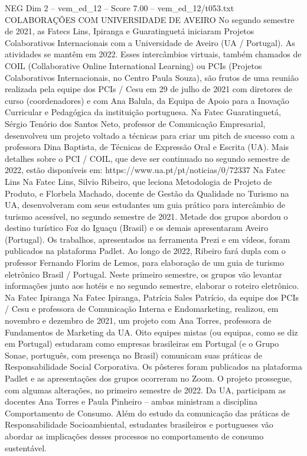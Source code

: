 \begin{textsample}{NEG Dim 2 – vem\_ed\_12 – Score 7.00 – vem\_ed\_12/t053.txt}  \label{ex:f2_neg_077}
COLABORAÇÕES COM UNIVERSIDADE DE AVEIRO No segundo semestre de 2021, as Fatecs Lins, Ipiranga e Guaratinguetá iniciaram Projetos Colaborativos Internacionais com a Universidade de Aveiro (UA / Portugal).
As atividades se mantêm em 2022.
Esses intercâmbios virtuais, também chamados de COIL (Collaborative Online International Learning) ou PCIs (Projetos Colaborativos Internacionais, no Centro Paula Souza), são frutos de uma reunião realizada pela equipe dos PCIs / Cesu em 29 de julho de 2021 com diretores de curso (coordenadores) e com Ana Balula, da Equipa de Apoio para a Inovação Curricular e Pedagógica da instituição portuguesa.
Na Fatec Guaratinguetá, Sérgio Tenório dos Santos Neto, professor de Comunicação Empresarial, desenvolveu um projeto voltado a técnicas para criar um pitch de sucesso com a professora Dina Baptista, de Técnicas de Expressão Oral e Escrita (UA).
Mais detalhes sobre o PCI / COIL, que deve ser continuado no segundo semestre de 2022, estão disponíveis em: https://www.ua.pt/pt/noticias/0/72337 Na Fatec Lins Na Fatec Lins, Silvio Ribeiro, que leciona Metodologia de Projeto de Produto, e Florbela Machado, docente de Gestão da Qualidade no Turismo na UA, desenvolveram com seus estudantes um guia prático para intercâmbio de turismo acessível, no segundo semestre de 2021.
Metade dos grupos abordou o destino turístico Foz do Iguaçu (Brasil) e os demais apresentaram Aveiro (Portugal).
Os trabalhos, apresentados na ferramenta Prezi e em vídeos, foram publicados na plataforma Padlet.
Ao longo de 2022, Ribeiro fará dupla com o professor Fernando Florim de Lemos, para elaboração de um guia de turismo eletrônico Brasil / Portugal.
Neste primeiro semestre, os grupos vão levantar informações junto aos hotéis e no segundo semestre, elaborar o roteiro eletrônico.
Na Fatec Ipiranga Na Fatec Ipiranga, Patrícia Sales Patrício, da equipe dos PCIs / Cesu e professora de Comunicação Interna e Endomarketing, realizou, em novembro e dezembro de 2021, um projeto com Ana Torres, professora de Fundamentos de Marketing da UA.
Oito equipes mistas (ou equipas, como se diz em Portugal) estudaram como empresas brasileiras em Portugal (e o Grupo Sonae, português, com presença no Brasil) comunicam suas práticas de Responsabilidade Social Corporativa.
Os pôsteres foram publicados na plataforma Padlet e as apresentações dos grupos ocorreram no Zoom.
O projeto prossegue, com algumas alterações, no primeiro semestre de 2022.
Da UA, participam as docentes Ana Torres e Paula Pinheiro – ambas ministram a disciplina Comportamento de Consumo.
Além do estudo da comunicação das práticas de Responsabilidade Socioambiental, estudantes brasileiros e portugueses vão abordar as implicações desses processos no comportamento de consumo sustentável.

\end{textsample}
